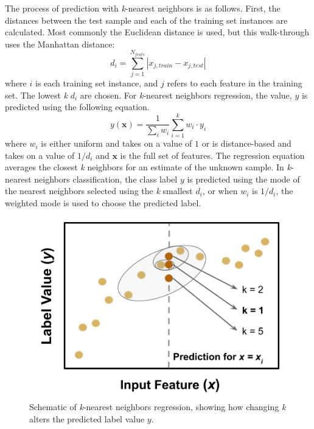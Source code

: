The process of prediction with \textit{k}-nearest neighbors is as follows.
First, the distances between the test sample and each of the training set
instances are calculated.  Most commonly the Euclidean distance is used, but
this walk-through uses the Manhattan distance:
\begin{equation}
  d_{i} = \sum_{j=1}^{N_{feats}} |x_{j,train} - x_{j,test}|
  \label{eq:l1}
\end{equation}
where $i$ is each training set instance, and $j$ refers to each feature in the
training set.  The lowest \textit{k} $d_{i}$ are chosen. For \textit{k}-nearest
neighbors regression, the value, $y$ is predicted using the following equation.
\begin{equation}
  y(\boldsymbol{x}) = \frac{1}{\sum_{i}{w_i}} \sum_{i=1}^{k} w_i \cdot y_i
  \label{eq:knn}
\end{equation}
where $w_{i}$ is either uniform and takes on a value of $1$ or is
distance-based and takes on a value of $1/d_{i}$ and $\boldsymbol{x}$ is the
full set of features. The regression equation averages the closest \textit{k}
neighbors for an estimate of the unknown sample.  In \textit{k}-nearest
neighbors classification, the class label $y$ is predicted using the mode of
the nearest neighbors selected using the \textit{k} smallest $d_i$, or when
$w_i$ is $1/d_i$, the weighted mode is used to choose the predicted label.

\begin{figure}[!htb]
  \centering
  \includegraphics[width=0.8\linewidth]{./chapters/litrev/nn-fig.png}
  \caption[Schematic of \textit{k}-nearest neighbors regression]
          {Schematic of \textit{k}-nearest neighbors regression, showing how 
           changing \textit{k} alters the predicted label value $y$.}
  \label{fig:nn}
\end{figure}


